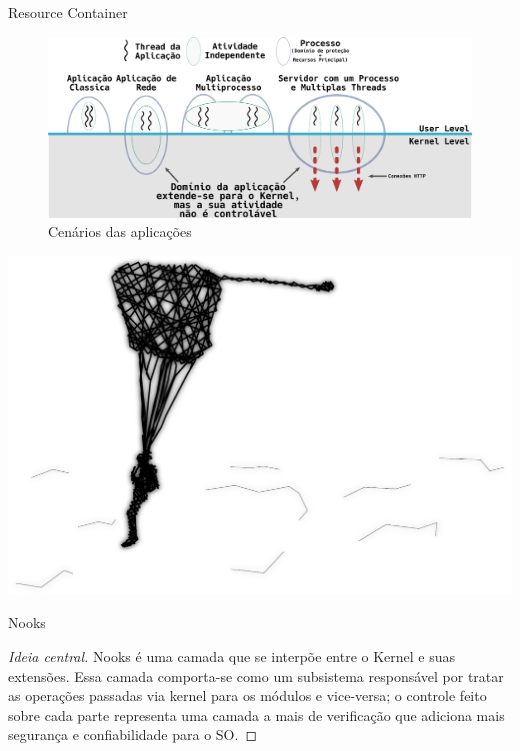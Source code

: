 \documentclass[xcolor={usenames,svgnames,dvipsnames},brazil,english,12pt,aspectratio=149]{beamer}
\begin{document}
\begin{frame}{Resource Container}
  \begin{figure}[!h]
    \centering
    \includegraphics[width=\textwidth]{resource_constainer_scenarios} 
    \caption*{Cenários das aplicações}
  \end{figure}
\end{frame}

\begin{frame}[plain]
  \includegraphics[width=\textwidth]{presentation_cap2_five}
\end{frame}

\begin{frame}{Nooks}

  \begin{proof}[Ideia central]
Nooks é uma camada que se interpõe entre o Kernel e suas extensões. Essa camada
comporta-se como um subsistema responsável por tratar as operações passadas via
kernel para os módulos e vice-versa; o controle feito sobre cada parte
representa uma camada a mais de verificação que adiciona mais segurança e
confiabilidade para o SO.
  \end{proof}

\end{frame}
\end{document}
